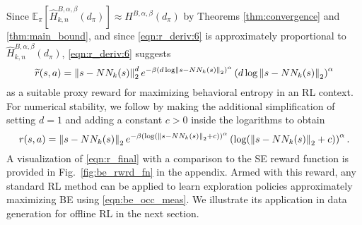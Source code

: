 %
Since $\mathbb{E}_{\pi} [ \widehat{H}^{B,\alpha,\beta}_{k,n}(d_{\pi}) ] \approx H^{B, \alpha, \beta} (d_{\pi})$ by Theorems \ref{thm:convergence} and \ref{thm:main_bound}, and since \eqref{eqn:r_deriv:6} is approximately proportional to $\widehat{H}^{B,\alpha,\beta}_{k,n}(d_{\pi})$, \eqref{eqn:r_deriv:6} suggests
%
\begin{equation} \label{eqn:r_deriv:7}
    \widetilde{r}(s, a) = \left\lVert s - NN_k(s)\right\rVert_2^d e^{-\beta(d \log \left\lVert s - NN_k(s)\right\rVert_2)^{\alpha}} \left( d \log \left\lVert s - NN_k(s)\right\rVert_2 \right)^\alpha
\end{equation}
%
as a suitable proxy reward for maximizing behavioral entropy in an RL context. For numerical stability, we follow \citep{yarats2021reinforcement, liu2021behavior} by making the additional simplification of setting $d=1$ and adding a constant $c > 0$ inside the logarithms to obtain
%
\begin{equation} \label{eqn:r_final}
    r(s, a) = \left\lVert s - NN_k(s)\right\rVert_2 e^{-\beta(\log( \left\lVert s - NN_k(s)\right\rVert_2 + c ) )^{\alpha}} \left( \log( \left\lVert s - NN_k(s)\right\rVert_2 + c ) \right)^\alpha.
\end{equation}
%
A visualization of \eqref{eqn:r_final} with a comparison to the SE reward function is provided in Fig.~\ref{fig:be_rwrd_fn} in the appendix. Armed with this reward, any standard RL method can be applied to learn exploration policies approximately maximizing BE using \eqref{eqn:be_occ_meas}. We illustrate its application in data generation for offline RL in the next section.
%
